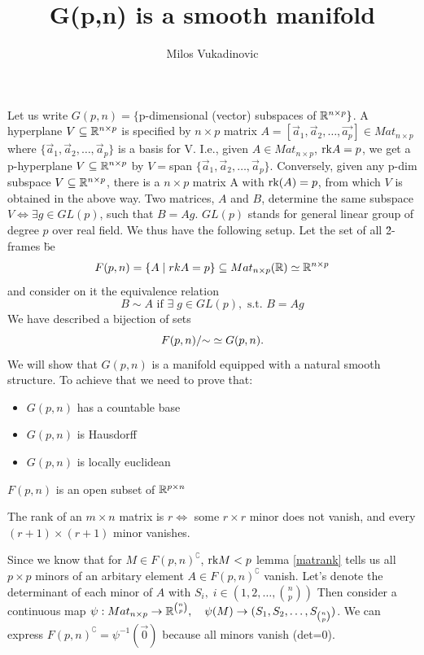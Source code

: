 \documentclass[11pt,a4paper]{report}
\author{Milos Vukadinovic}
\title{G(p,n) is a smooth manifold}
\begin{document}
Let us write $G(p,n) = \{ $p-dimensional (vector) subspaces of $\mathbb{R}^{n \times p} \}$. A hyperplane $V \subseteq \mathbb{R}^{n \times p}$ is specified by $n \times p$ matrix $A=[\vec{a}_1,\vec{a}_2, \dots, \vec{a_p}] \in Mat_{n\times p}$ where 
$\{\vec{a}_1, \vec{a}_2, \dots , \vec{a}_p \}$ is a basis for V. I.e., given $A \in Mat_{n\times p}$, $\textrm{rk} A = p$, we get a p-hyperplane $V \subseteq \mathbb{R}^{n \times p}$ by $V= $span $\{\vec{a}_1,\vec{a}_2, \dots, \vec{a}_p \} $. Conversely, given any p-dim subspace $V\subseteq \mathbb{R}^{n \times p}$, there is a $n \times p$
matrix A with $\textrm{rk}(A)=p$, from which $V$ is obtained in the above way. Two matrices, $A$ and $B$, determine the same subspace $V \iff \exists g \in GL(p) $, such that $B = A g$. $GL(p)$ stands for general linear group of degree $p$ over real field.
\newline
We thus have the following setup. Let the set of all \" 2-frames \" be
$$ F(p,n) = \{ A \; | \;  rkA=p \} \subseteq Mat_{n \times p}(\mathbb{R})  \simeq \mathbb{R}^{n \times p} $$
and consider on it the equivalence relation
$$ B \sim A \text{ if } \exists \; g \in GL(p), \text{ s.t. } B=Ag $$
We have described a bijection of sets
$$ F(p,n)/{\sim} \simeq  G(p,n). $$ 
We will show that $G(p,n)$ is a manifold equipped with a natural smooth structure. To achieve that we need to prove that:
\begin{itemize}
    \item $G(p,n)$ has a countable base
    \item $G(p,n)$ is Hausdorff
    \item $G(p,n)$ is locally euclidean
\end{itemize}
\begin{Prop}
    $F(p,n)$ is an open subset of $\mathbb{R}^{p \times n}$
\end{Prop}
\begin{Lemma}\label{matrank}
    The rank of an $m \times n$ matrix is $r \iff$ some $r \times r$ minor does not vanish,
    and every $(r+1) \times (r+1)$ minor vanishes.
\end{Lemma}
Since we know that for $M \in F(p,n)^\complement$, $\textrm{rk} M <p$ lemma \ref{matrank} tells us all $p \times p$ minors
of an arbitary element $ A \in F(p,n)^\complement$ vanish. Let's denote the determinant of each minor of $A$ with $S_i, \; i\in (1,2, \dots ,  {n \choose p})$ 
Then consider a continuous map
$ \psi: Mat_{n \times p} \to \mathbb{R}^{ n \choose p}, \quad \psi(M) \to (S_1,S_2, \dots, S_{n \choose p})$.
We can express $F(p,n)^\complement = \psi ^{-1} ( \vec{0} )$ because all minors vanish (det=0).
\end{document}

